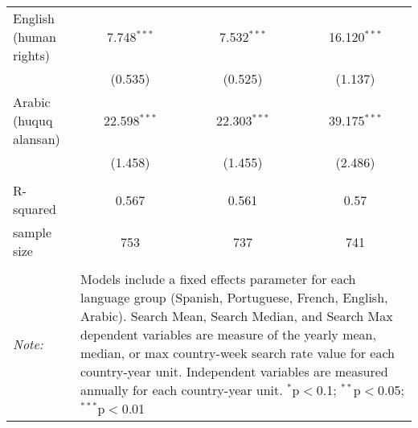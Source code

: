\begin{table}[!htbp]
\begin{tabular}{@{\extracolsep{5pt}}lccc}
  English (human rights) & 7.748$^{***}$ & 7.532$^{***}$ & 16.120$^{***}$ \\ 
  & (0.535) & (0.525) & (1.137) \\ 
  Arabic (huquq alansan) & 22.598$^{***}$ & 22.303$^{***}$ & 39.175$^{***}$ \\ 
  & (1.458) & (1.455) & (2.486) \\ 
 \hline \\[-1.8ex] 
R-squared  & 0.567 & 0.561 & 0.57 \\ 
sample size  & 753 & 737 & 741 \\ 
\hline 
\hline \\[-1.8ex] 
\textit{Note:}  & \multicolumn{3}{l}{\parbox[t]{8cm}{Models include a fixed effects parameter for each language group (Spanish, Portuguese, French, English, Arabic). Search Mean, Search Median, and Search Max dependent variables are measure of the yearly mean, median, or max country-week search rate value for each country-year unit. Independent variables are measured annually for each country-year unit. $^{*}$p$<$0.1; $^{**}$p$<$0.05; $^{***}$p$<$0.01}} \\ 
\end{tabular} 
\end{table} 
